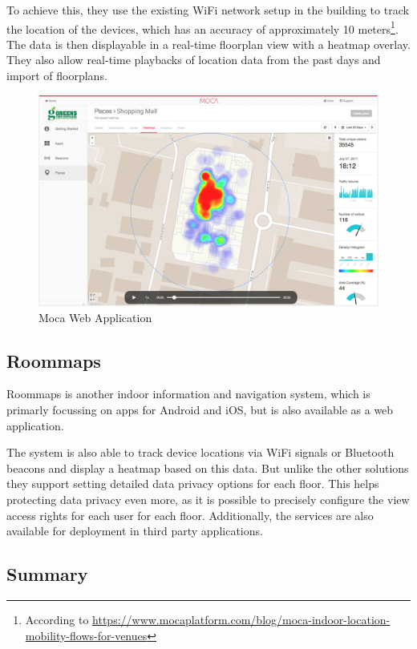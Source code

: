 To achieve this, they use the existing WiFi network setup in the building to track the location of the devices, which has an accuracy of approximately 10 meters\footnote{According to \url{https://www.mocaplatform.com/blog/moca-indoor-location-mobility-flows-for-venues}}. The data is then displayable in a real-time floorplan view with a heatmap overlay. They also allow real-time playbacks of location data from the past days and import of floorplans.

\begin{figure}[!hb]
	\centering
	\includegraphics[width=0.9\linewidth]{images/Moca}
	\caption{Moca Web Application}
	\label{fig:InfsoftApplication}
\end{figure}

\clearpage

\subsection{Roommaps}

Roommaps is another indoor information and navigation system, which is primarly focussing on apps for Android and iOS, but is also available as a web application.

The system is also able to track device locations via WiFi signals or Bluetooth beacons and display a heatmap based on this data. 
But unlike the other solutions they support setting detailed data privacy options for each floor. This helps protecting data privacy even more, as it is possible to precisely configure the view access rights for each user for each floor. Additionally, the services are also available for deployment in third party applications.

\subsection{Summary}

